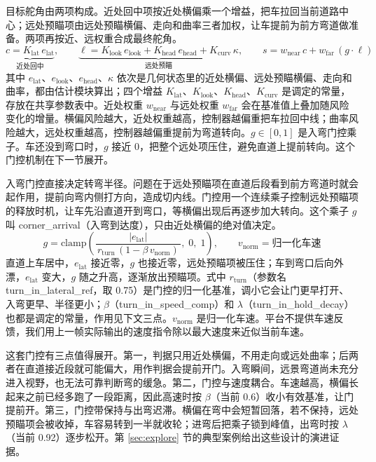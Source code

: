 \documentclass[UTF8,a4paper]{ctexart}
\begin{document}
目标舵角由两项构成。近处回中项按近处横偏乘一个增益，把车拉回当前道路中心；远处预瞄项由远处预瞄横偏、走向和曲率三者加权，让车提前为前方弯道做准备。两项再按近、远权重合成最终舵角。
\begin{equation*}
	\underbrace{c = K_{\text{lat}}\,e_{\text{lat}}}_{\text{近处回中}},\qquad
	\underbrace{\ell = K_{\text{look}}\,e_{\text{look}} + K_{\text{head}}\,e_{\text{head}} + K_{\text{curv}}\,\kappa}_{\text{远处预瞄}},\qquad
	s = w_{\text{near}}\,c + w_{\text{far}}\,(g\cdot\ell)
\end{equation*}
其中 $e_{\text{lat}}$、$e_{\text{look}}$、$e_{\text{head}}$、$\kappa$ 依次是几何状态里的近处横偏、远处预瞄横偏、走向和曲率，都由估计模块算出；四个增益 $K_{\text{lat}}$、$K_{\text{look}}$、$K_{\text{head}}$、$K_{\text{curv}}$ 是调定的常量，存放在共享参数表中。近处权重 $w_{\text{near}}$ 与远处权重 $w_{\text{far}}$ 会在基准值上叠加随风险变化的增量。横偏风险越大，近处权重越高，控制器越偏重把车拉回中线；曲率风险越大，远处权重越高，控制器越偏重提前为弯道转向。$g\in[0,1]$ 是入弯门控乘子。车还没到弯口时，$g$ 接近 0，把整个远处项压住，避免直道上提前转向。这个门控机制在下一节展开。

入弯门控直接决定转弯半径。问题在于远处预瞄项在直道后段看到前方弯道时就会起作用，提前向弯内侧打方向，造成切内线。门控用一个连续乘子控制远处预瞄项的释放时机，让车先沿直道开到弯口，等横偏出现后再逐步加大转向。这个乘子 $g$ 叫 corner\_arrival（入弯到达度），只由近处横偏的绝对值决定。
\begin{equation*}
	g = \mathrm{clamp}\!\left(\frac{|e_{\text{lat}}|}{\,r_{\text{turn}}\,(1 - \beta\, v_{\text{norm}})\,},\; 0,\; 1\right),\qquad v_{\text{norm}}=\text{归一化车速}
\end{equation*}
直道上车居中，$e_{\text{lat}}$ 接近零，$g$ 也接近零，远处预瞄项被压住；车到弯口后向外漂，$e_{\text{lat}}$ 变大，$g$ 随之升高，逐渐放出预瞄项。式中 $r_{\text{turn}}$（参数名 turn\_in\_lateral\_ref，取 0.75）是门控的归一化基准，调小它会让门更早打开、入弯更早、半径更小；$\beta$（turn\_in\_speed\_comp）和 $\lambda$（turn\_in\_hold\_decay）也都是调定的常量，作用见下文三点。$v_{\text{norm}}$ 是归一化车速。平台不提供车速反馈，我们用上一帧实际输出的速度指令除以最大速度来近似当前车速。

这套门控有三点值得展开。第一，判据只用近处横偏，不用走向或远处曲率；后两者在直道接近段就可能偏大，用作判据会提前开门。入弯瞬间，远景弯道尚未充分进入视野，也无法可靠判断弯的缓急。第二，门控与速度耦合。车速越高，横偏长起来之前已经多跑了一段距离，因此高速时按 $\beta$（当前 0.6）收小有效基准，让门提前开。第三，门控带保持与出弯迟滞。横偏在弯中会短暂回落，若不保持，远处预瞄项会被收掉，车容易转到一半就收轮；进弯后把乘子锁到峰值，出弯时按 $\lambda$（当前 0.92）逐步松开。第 \ref{sec:explore} 节的典型案例给出这些设计的演进证据。
\end{document}
